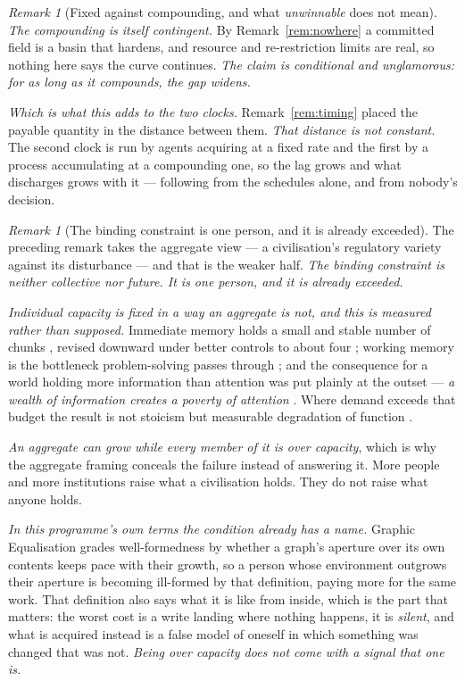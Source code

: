 \documentclass[11pt,a4paper]{article}
\theoremstyle{remark}
\newtheorem{remark}[definition]{Remark}
\begin{document}
\begin{remark}[Fixed against compounding, and what \emph{unwinnable} does not mean]
\emph{The compounding is itself contingent.} By Remark~\ref{rem:nowhere} a committed field is a basin
that hardens, and resource and re-restriction limits are real, so nothing here says the curve continues.
\emph{The claim is conditional and unglamorous: for as long as it compounds, the gap widens.}

\emph{Which is what this adds to the two clocks.} Remark~\ref{rem:timing} placed the payable quantity in
the distance between them. \emph{That distance is not constant.} The second clock is run by agents
acquiring at a fixed rate and the first by a process accumulating at a compounding one, so the lag grows
and what discharges grows with it --- following from the schedules alone, and from nobody's decision.
\end{remark}

\begin{remark}[The binding constraint is one person, and it is already exceeded]\label{rem:individual}
The preceding remark takes the aggregate view --- a civilisation's regulatory variety against its
disturbance --- and that is the weaker half. \emph{The binding constraint is neither collective nor
future. It is one person, and it is already exceeded.}

\emph{Individual capacity is fixed in a way an aggregate is not, and this is measured rather than
supposed.} Immediate memory holds a small and stable number of chunks \citep{miller1956}, revised
downward under better controls to about four \citep{cowan2001}; working memory is the bottleneck
problem-solving passes through \citep{sweller1988}; and the consequence for a world holding more
information than attention was put plainly at the outset --- \emph{a wealth of information creates a
poverty of attention} \citep{simon1971}. Where demand exceeds that budget the result is not stoicism but
measurable degradation of function \citep{mani2013}.

\emph{An aggregate can grow while every member of it is over capacity}, which is why the aggregate
framing conceals the failure instead of answering it. More people and more institutions raise what a
civilisation holds. They do not raise what anyone holds.

\emph{In this programme's own terms the condition already has a name.} Graphic Equalisation grades
well-formedness by whether a graph's aperture over its own contents keeps pace with their growth, so a
person whose environment outgrows their aperture is becoming ill-formed by that definition, paying more
for the same work. That definition also says what it is like from inside, which is the part that
matters: the worst cost is a write landing where nothing happens, it is \emph{silent}, and what is
acquired instead is a false model of oneself in which something was changed that was not. \emph{Being
over capacity does not come with a signal that one is.}


\end{remark}
\end{document}
